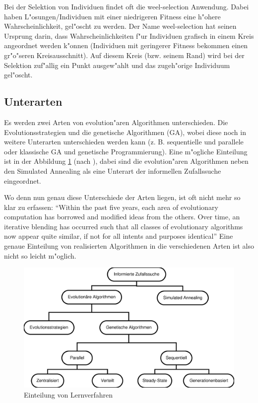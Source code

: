 Bei der Selektion von Individuen findet oft die weel-selection Anwendung.
Dabei haben L"osungen/Individuen mit einer niedrigeren Fitness eine h"ohere Wahrscheinlichkeit, gel"oscht zu werden. Der Name weel-selection hat seinen Ursprung darin, dass Wahrscheinlichkeiten f"ur Individuen grafisch in einem Kreis angeordnet werden k"onnen (Individuen mit geringerer Fitness bekommen einen gr"o"seren Kreisausschnitt). Auf diesem Kreis (bzw. seinem Rand) wird bei der Selektion zuf"allig ein Punkt ausgew"ahlt und das zugeh"orige Individuum gel"oscht.


\subsection{Unterarten}

Es werden zwei Arten von evolution"aren Algorithmen unterschieden. Die Evolutionsstrategien und die genetische Algorithmen (GA), wobei diese noch in weitere Unterarten unterschieden werden kann (z. B. sequentielle und parallele oder klassische GA und genetische Programmierung).
Eine m"ogliche Einteilung ist in der Abbildung \ref{genAbst}  (nach \cite{GEA}), dabei sind die evolution"aren Algorithmen neben den Simulated Annealing als eine Unterart der informellen Zufallssuche eingeordnet.

Wo denn nun genau diese Unterschiede der Arten liegen, ist oft nicht mehr so klar zu erfassen:
\cite{ECDF00} ``Within the past five years, each area of evolutionary computation has borrowed and modified ideas from the others. Over time, an iterative blending has occurred such that all classes of evolutionary algorithms now appear quite similar, if not for all intents and purposes identical''
Eine genaue Einteilung von realisierten Algorithmen in die verschiedenen Arten ist also nicht so leicht m"oglich.


\begin{figure}[htbp]
\begin{center}
  \includegraphics[scale=0.4]{unterteilung_EA_GA.eps}
\end{center}
\caption{Einteilung von Lernverfahren}
\label{genAbst}
\end{figure}


